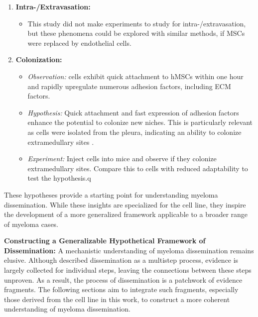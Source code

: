 \begin{enumerate}
\begin{itemize}
            \end{itemize}
      \item \textbf{Intra-/Extravasation:}
            \begin{itemize}
                  \item This study did not make experiments to study for
                        intra-/extravasation, but these phenomena could be
                        explored with similar methods, if MSCs were replaced by
                        endothelial cells.
            \end{itemize}
      \item \textbf{Colonization:}
            \begin{itemize}
                  \item \textit{Observation:} \INA cells exhibit quick
                        attachment to \acp{hMSC} within one hour and rapidly
                        upregulate numerous adhesion factors, including \ac{ECM}
                        factors.
                  \item \textit{Hypothesis:} Quick attachment and fast
                        expression of adhesion factors enhance the potential to
                        colonize new niches. This is particularly relevant as \INA
                        cells were isolated from the pleura, indicating an ability to
                        colonize extramedullary sites
                        \cite{burgerGp130RasMediated2001c}.
                  \item \textit{Experiment:} Inject \INA cells into mice and
                        observe if they colonize extramedullary sites. Compare this to
                        \INA cells with reduced adaptability to test the hypothesis.q
            \end{itemize}
\end{enumerate}


These hypotheses   provide a starting
point for understanding myeloma dissemination. While these insights are
specialized for the \INA cell line, they inspire the development of a more
generalized framework applicable to a broader range of myeloma cases.

\textbf{Constructing a Generalizable Hypothetical Framework of Dissemination:}
A mechanistic understanding of myeloma dissemination remains elusive. Although
\citet{zeissigTumourDisseminationMultiple2020} described dissemination as a
multistep process, evidence is largely collected for individual steps, leaving
the connections between these steps unproven. As a result, the process of
dissemination is a patchwork of evidence fragments. The following sections aim
to integrate such fragments, especially those derived from the \INA cell line in
this work, to construct a more coherent understanding of myeloma dissemination.


